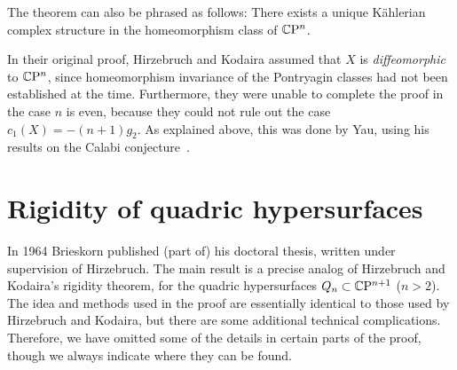 \begin{rem}\leavevmode
	\begin{numberedlist}
		\item The theorem can also be phrased as follows: There exists a unique K\"ahlerian complex structure in the homeomorphism class of $\mathbb{C}\mathrm{P}^n$.
		\item In their original proof, Hirzebruch and Kodaira assumed that $X$ is \emph{diffeomorphic} to $\mathbb{C}\mathrm{P}^n$, since homeomorphism invariance of the Pontryagin classes had not been established at the time. Furthermore, they were unable to complete the proof in the case $n$ is even, because they could not rule out the case $c_1(X)=-(n+1)g_2$. As explained above, this was done by Yau, using his results on the Calabi conjecture~\cite{Yau1977}.
	\end{numberedlist}
\end{rem}

\section{Rigidity of quadric hypersurfaces}

In 1964 Brieskorn published (part of) his doctoral thesis, written under supervision of Hirzebruch. The main result is a precise analog of Hirzebruch and Kodaira's rigidity theorem, for the quadric hypersurfaces $Q_n\subset \mathbb{C}\mathrm{P}^{n+1}$ ($n>2$). The idea and methods used in the proof are essentially identical to those used by Hirzebruch and Kodaira, but there are some additional technical complications. Therefore, we have omitted some of the details in certain parts of the proof, though we always indicate where they can be found.

